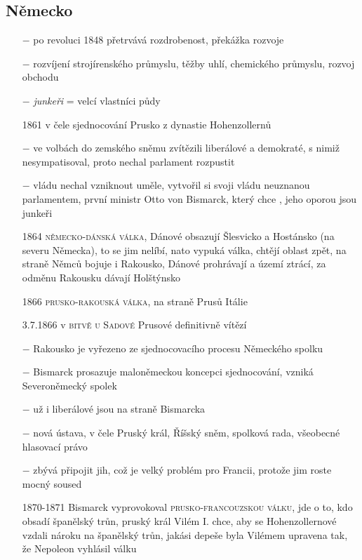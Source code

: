 \documentclass{article}
\begin{document}
\subsection*{Německo}
\begin{itemize}
    \vspace{-0.5em}
    \setlength\itemsep{0.15em}
    \item[$-$] po revoluci 1848 přetrvává rozdrobenost, překážka rozvoje
    \item[$-$] rozvíjení strojírenského průmyslu, těžby uhlí, chemického průmyslu, rozvoj obchodu
    \item[$-$] \textit{junkeři} = velcí vlastníci půdy
    \item[1861] v čele sjednocování Prusko z dynastie Hohenzollernů
    \item[$-$] ve volbách do zemského sněmu zvítězili liberálové a demokraté, s nimiž nesympatisoval, proto nechal parlament rozpustit
    \item[$-$] vládu nechal vzniknout uměle, vytvořil si svoji vládu neuznanou parlamentem, první ministr Otto von Bismarck, který chce , jeho oporou jsou junkeři
    \item[1864] \textsc{německo-dánská válka}, Dánové obsazují  Šlesvicko a Hostánsko (na severu Německa), to se jim nelíbí, nato vypuká válka, chtějí oblast zpět, na straně Němců bojuje i Rakousko, Dánové prohrávají a území ztrácí, za odměnu Rakousku dávají Holštýnsko
    \item[1866] \textsc{prusko-rakouská válka}, na straně Prusů Itálie
    \item[3.7.1866] v \textsc{bitvě u Sadové} Prusové definitivně vítězí
    \item[$-$] Rakousko je vyřezeno ze sjednocovacího procesu Německého spolku
    \item[$-$] Bismarck prosazuje maloněmeckou koncepci sjednocování, vzniká Severoněmecký spolek
    \item[$-$] už i liberálové jsou na straně Bismarcka
    \item[$-$] nová ústava, v čele Pruský král, Říšský sněm, spolková rada, všeobecné hlasovací právo
    \item[$-$] zbývá připojit jih, což je velký problém pro Francii, protože jim roste mocný soused
    \item[1870-1871] Bismarck vyprovokoval \textsc{prusko-francouzskou válku}, jde o to, kdo obsadí španělský trůn, pruský král Vilém I. chce, aby se Hohenzollernové vzdali nároku na španělský trůn, jakási depeše byla Vilémem upravena tak, že Nepoleon vyhlásil válku

\end{itemize}
\end{document}
